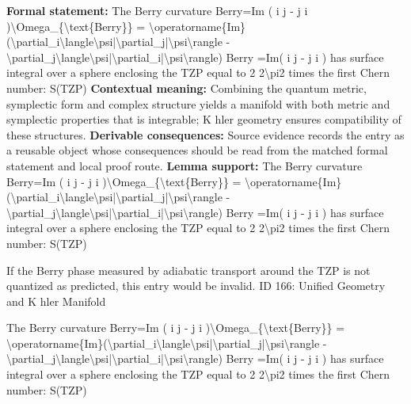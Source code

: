 \begingroup\footnotesize\setlength{\emergencystretch}{3em}\sloppy
\textbf{Formal statement:} The Berry curvature  Berry=Im ( i    j   - j    i   )\textbackslash{}Omega\_\{\textbackslash{}text\{Berry\}\} = \textbackslash{}operatorname\{Im\}(\textbackslash{}partial\_i\textbackslash{}langle\textbackslash{}psi|\textbackslash{}partial\_j|\textbackslash{}psi\textbackslash{}rangle - \textbackslash{}partial\_j\textbackslash{}langle\textbackslash{}psi|\textbackslash{}partial\_i|\textbackslash{}psi\textbackslash{}rangle) Berry =Im( i     j    - j     i    ) has surface integral over a sphere enclosing the TZP equal to 2 2\textbackslash{}pi2  times the first Chern number:  S(TZP)
\textbf{Contextual meaning:} Combining the quantum metric, symplectic form and complex structure yields a manifold with both metric and symplectic properties that is integrable; K hler geometry ensures compatibility of these structures.  
\textbf{Derivable consequences:} Source evidence records the entry as a reusable object whose consequences should be read from the matched formal statement and local proof route.
\textbf{Lemma support:} The Berry curvature  Berry=Im ( i    j   - j    i   )\textbackslash{}Omega\_\{\textbackslash{}text\{Berry\}\} = \textbackslash{}operatorname\{Im\}(\textbackslash{}partial\_i\textbackslash{}langle\textbackslash{}psi|\textbackslash{}partial\_j|\textbackslash{}psi\textbackslash{}rangle - \textbackslash{}partial\_j\textbackslash{}langle\textbackslash{}psi|\textbackslash{}partial\_i|\textbackslash{}psi\textbackslash{}rangle) Berry =Im( i     j    - j     i    ) has surface integral over a sphere enclosing the TZP equal to 2 2\textbackslash{}pi2  times the first Chern number:  S(TZP)\par
\endgroup

If the Berry phase measured by adiabatic transport around the TZP is not quantized as predicted, this entry would be invalid. ID 166: Unified Geometry and K hler Manifold  

The Berry curvature  Berry=Im ( i    j   - j    i   )\textbackslash{}Omega\_\{\textbackslash{}text\{Berry\}\} = \textbackslash{}operatorname\{Im\}(\textbackslash{}partial\_i\textbackslash{}langle\textbackslash{}psi|\textbackslash{}partial\_j|\textbackslash{}psi\textbackslash{}rangle - \textbackslash{}partial\_j\textbackslash{}langle\textbackslash{}psi|\textbackslash{}partial\_i|\textbackslash{}psi\textbackslash{}rangle) Berry =Im( i     j    - j     i    ) has surface integral over a sphere enclosing the TZP equal to 2 2\textbackslash{}pi2  times the first Chern number:  S(TZP)

